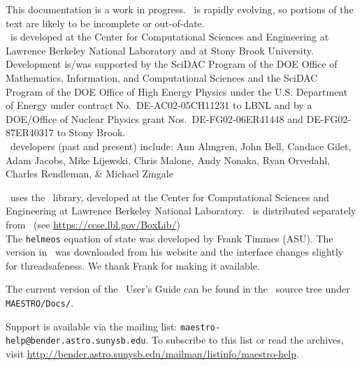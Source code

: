 This documentation is a work in progress.  \maestro\ is rapidly
evolving, so portions of the text are likely to be incomplete or
out-of-date. \\

\noindent \maestro\ is developed at the Center for Computational Sciences and
Engineering at Lawrence Berkeley National Laboratory and at Stony
Brook University.  Development is/was supported by the SciDAC Program of
the DOE Office of Mathematics, Information, and Computational Sciences
and the SciDAC Program of the DOE Office of High Energy Physics under
the U.S. Department of Energy under contract No.\ DE-AC02-05CH11231 to
LBNL and by a DOE/Office of Nuclear Physics grant Nos.\
DE-FG02-06ER41448 and DE-FG02-87ER40317 to Stony Brook.  \\

\noindent \maestro\ developers (past and present) include: Ann Almgren, John
Bell, Candace Gilet, Adam Jacobs, Mike Lijewski, Chris Malone, Andy
Nonaka, Ryan Orvedahl, Charles Rendleman, \& Michael Zingale

\noindent \maestro\ uses the \boxlib\ library,
developed at the Center for Computational Sciences and Engineering at
Lawrence Berkeley National Laboratory.  \boxlib\ is distributed
separately from \maestro\ (see
\url{https://ccse.lbl.gov/BoxLib/})
\\

\noindent The {\tt helmeos} equation of state was developed by Frank Timmes (ASU).
The version in \maestro\ was downloaded from his website and the
interface changes slightly for threadsafeness.  We thank Frank for
making it available.

\noindent The current version of the \maestro\ User's Guide can be found in 
the \maestro\ source tree under {\tt MAESTRO/Docs/}.


\noindent Support is available via the mailing list: {\tt maestro-help@bender.astro.sunysb.edu}.  To subscribe to this list or read the archives, visit
\url{http://bender.astro.sunysb.edu/mailman/listinfo/maestro-help}.
